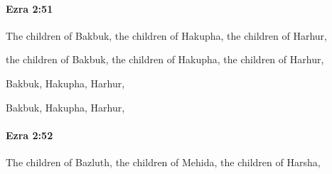 		\paragraph{Ezra 2:51} %
			\label{EZRA-2-51}

			The children of Bakbuk, the children of Hakupha, the children of Harhur,

			\begin{versebox}
					\item[BHS] 
					\item[LXX] 
					\item[ASV] the children of Bakbuk, the children of Hakupha, the children of Harhur,
					\item[NIV] Bakbuk, Hakupha, Harhur,
					\item[NRSV] Bakbuk, Hakupha, Harhur,
			\end{versebox}

		\paragraph{Ezra 2:52} %
			\label{EZRA-2-52}

			The children of Bazluth, the children of Mehida, the children of Harsha,

